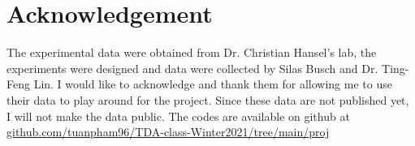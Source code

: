 \section{Acknowledgement}

The experimental data were obtained from Dr. Christian Hansel's lab, the experiments were designed and data were collected by Silas Busch and Dr. Ting-Feng Lin. I would like to acknowledge and thank them for allowing me to use their data to play around for the project. Since these data are not published yet, I will not make the data public. The codes are available on github at \url{github.com/tuanpham96/TDA-class-Winter2021/tree/main/proj}

